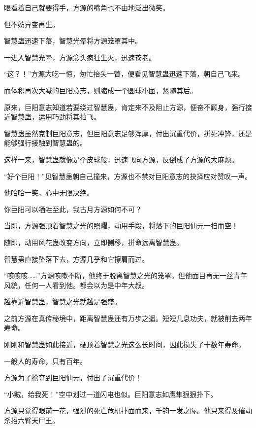 
\begin{this_body}

眼看着自己就要得手，方源的嘴角也不由地泛出微笑。

但不妨异变再生。

智慧蛊迅速下落，智慧光晕将方源笼罩其中。

一进入智慧光晕，方源念头疯狂生灭，迅速苍老。

“这？！”方源大吃一惊，匆忙抬头一瞥，便看见智慧蛊迅速下落，朝自己飞来。

而体积再次大减的巨阳意志，则缩成一个圆球小团，紧随其后。

原来，巨阳意志知道若要绕过智慧蛊，肯定来不及阻止方源，便奋不顾身，强行接近智慧蛊，运用巧劲将其拍飞。

智慧蛊虽然克制巨阳意志，但巨阳意志足够浑厚，付出沉重代价，拼死冲锋，还是能够强行接触到智慧蛊的。

这样一来，智慧蛊就像是个皮球般，迅速飞向方源，反倒成了方源的大麻烦。

“好个巨阳！”见智慧蛊朝自己撞来，方源也不禁对巨阳意志的抉择应对赞叹一声。

他哈哈一笑，心中无限决绝。

你巨阳可以牺牲至此，我古月方源如何不可？

当即，方源强顶着智慧之光的照耀，动用手段，将落下的巨阳仙元一扫而空！

随即，动用风花蛊改变方向，立即侧移，拼命远离智慧蛊。

智慧蛊直接坠落下去，方源几乎和它擦肩而过。

“咳咳咳……”方源咳嗽不断，他终于脱离智慧之光的笼罩。但他面目再无一丝青年风貌，任何一人看到他。都会以为是中年大叔。

越靠近智慧蛊，智慧之光就越是强盛。

之前方源在真传秘境中，距离智慧蛊还有万步之遥。短短几息功夫，就被削去两年寿命。

刚刚和智慧蛊如此接近，硬顶着智慧之光这么长时间，因此损失了十数年寿命。

一般人的寿命，只有百年。

方源为了抢夺到巨阳仙元，付出了沉重代价！

“小贼，给我死！”空中划过一道闪电也似。巨阳意志如鹰隼狠狠扑下。

方源只觉得眼前一花，强烈的死亡危机扑面而来，千钧一发之际。他只来得及催动杀招六臂天尸王。


\end{this_body}
